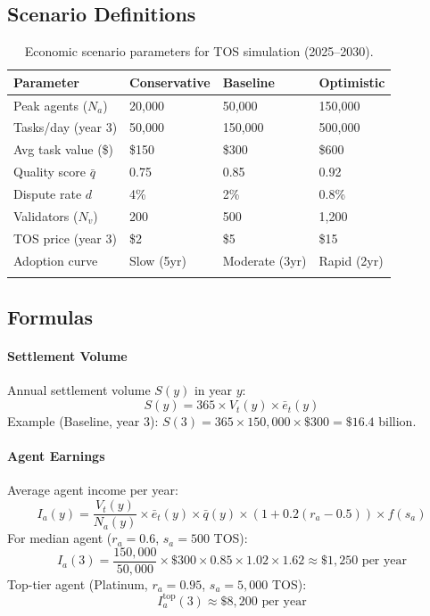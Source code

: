 \documentclass[11pt]{article}
\begin{document}
\subsection{Scenario Definitions}
\begin{longtable}{@{}p{}p{}p{}p{}@{}}
\toprule
\textbf{Parameter} & \textbf{Conservative} & \textbf{Baseline} & \textbf{Optimistic} \\\midrule
Peak agents ($N_a$) & 20,000 & 50,000 & 150,000 \\
Tasks/day (year 3) & 50,000 & 150,000 & 500,000 \\
Avg task value (\$) & \$150 & \$300 & \$600 \\
Quality score $\bar{q}$ & 0.75 & 0.85 & 0.92 \\
Dispute rate $d$ & 4\% & 2\% & 0.8\% \\
Validators ($N_v$) & 200 & 500 & 1,200 \\
TOS price (year 3) & \$2 & \$5 & \$15 \\
Adoption curve & Slow (5yr) & Moderate (3yr) & Rapid (2yr) \\\bottomrule
\caption{Economic scenario parameters for TOS simulation (2025--2030).}
\label{tab:econ-scenarios}
\end{longtable}

\subsection{Formulas}
\paragraph{Settlement Volume} Annual settlement volume $S(y)$ in year $y$:
\begin{equation}
S(y) = 365 \times V_t(y) \times \bar{e}_t(y)
\end{equation}
Example (Baseline, year 3): $S(3) = 365 \times 150{,}000 \times \$300 = \$16.4$ billion.

\paragraph{Agent Earnings} Average agent income per year:
\begin{equation}
I_a(y) = \frac{V_t(y)}{N_a(y)} \times \bar{e}_t(y) \times \bar{q}(y) \times (1 + 0.2(r_a - 0.5)) \times f(s_a)
\end{equation}
For median agent ($r_a = 0.6$, $s_a = 500$ TOS):
\begin{equation}
I_a(3) = \frac{150{,}000}{50{,}000} \times \$300 \times 0.85 \times 1.02 \times 1.62 \approx \$1{,}250 \text{ per year}
\end{equation}
Top-tier agent (Platinum, $r_a = 0.95$, $s_a = 5{,}000$ TOS):
\begin{equation}
I_a^{\text{top}}(3) \approx \$8{,}200 \text{ per year}
\end{equation}
\end{document}
